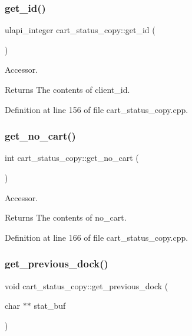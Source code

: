 \subsubsection{\texorpdfstring{get\+\_\+id()}{get\_id()}}
{\footnotesize\ttfamily ulapi\+\_\+integer cart\+\_\+status\+\_\+copy\+::get\+\_\+id (\begin{DoxyParamCaption}{ }\end{DoxyParamCaption})}

Accessor. \begin{DoxyReturn}{Returns}
The contents of client\+\_\+id. 
\end{DoxyReturn}


Definition at line 156 of file cart\+\_\+status\+\_\+copy.\+cpp.

\mbox{\label{classcart__status__copy_ae9b79c2205e6d9e2c64ac206cf551366}} 
\subsubsection{\texorpdfstring{get\+\_\+no\+\_\+cart()}{get\_no\_cart()}}
{\footnotesize\ttfamily int cart\+\_\+status\+\_\+copy\+::get\+\_\+no\+\_\+cart (\begin{DoxyParamCaption}{ }\end{DoxyParamCaption})}

Accessor. \begin{DoxyReturn}{Returns}
The contents of no\+\_\+cart. 
\end{DoxyReturn}


Definition at line 166 of file cart\+\_\+status\+\_\+copy.\+cpp.

\mbox{\label{classcart__status__copy_a8341c76c3b3c10809ae24232dbe9b865}} 
\subsubsection{\texorpdfstring{get\+\_\+previous\+\_\+dock()}{get\_previous\_dock()}}
{\footnotesize\ttfamily void cart\+\_\+status\+\_\+copy\+::get\+\_\+previous\+\_\+dock (\begin{DoxyParamCaption}\item[{char $\ast$$\ast$}]{stat\+\_\+buf }\end{DoxyParamCaption})}

